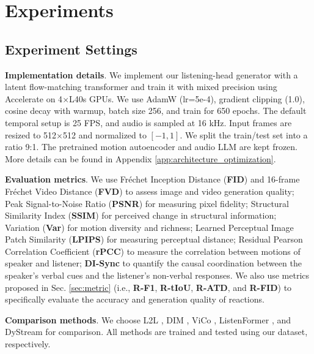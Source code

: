 \vspace{-0.5em}
\section{Experiments}
\vspace{-0.5em}

\subsection{Experiment Settings}

\textbf{Implementation details}. We implement our listening-head generator with a latent flow-matching transformer and train it with mixed precision using Accelerate on 4$\times$L40s GPUs. We use AdamW (lr=5e-4), gradient clipping (1.0), cosine decay with warmup, batch size 256, and train for 650 epochs. 
The default temporal setup is 25 FPS, and audio is sampled at 16 kHz. Input frames are resized to 512$\times$512 and normalized to \([-1,1]\). 
We split the train/test set into a ratio 9:1. 
The pretrained motion autoencoder \cite{wang2022lia} and audio LLM \cite{Qwen2-Audio} are kept frozen. 
More details can be found in Appendix \ref{app:architecture_optimization}.

\textbf{Evaluation metrics}. We use Fréchet Inception Distance (\textbf{FID}) \cite{Seitzer2020FID} and 16-frame Fréchet Video Distance (\textbf{FVD}) \cite{unterthiner2018fvd} to assess image and video generation quality; Peak Signal-to-Noise Ratio (\textbf{PSNR}) for measuring pixel fidelity; Structural Similarity Index (\textbf{SSIM}) for perceived change in structural information; Variation (\textbf{Var}) \cite{ng2022learning} for motion diversity and richness; Learned Perceptual Image Patch Similarity (\textbf{LPIPS}) \cite{zhang2018lpips} for measuring perceptual distance; Residual Pearson Correlation Coefficient (\textbf{rPCC}) to measure the correlation between motions of speaker and listener; \textbf{DI-Sync} \cite{pan2026interdyad} to quantify the causal coordination between the speaker’s verbal cues and the listener’s non-verbal responses. We also use metrics proposed in Sec. \ref{sec:metric} (i.e., \textbf{R-F1}, \textbf{R-tIoU}, \textbf{R-ATD}, and \textbf{R-FID}) to specifically evaluate the accuracy and generation quality of reactions.

\textbf{Comparison methods}. We choose L2L \cite{ng2022learning}, DIM \cite{tran2024dim}, ViCo \cite{zhou2022vico}, ListenFormer \cite{liu2024listenformer}, and DyStream \cite{chen2025dystream} for comparison. All methods are trained and tested using our dataset, respectively.



